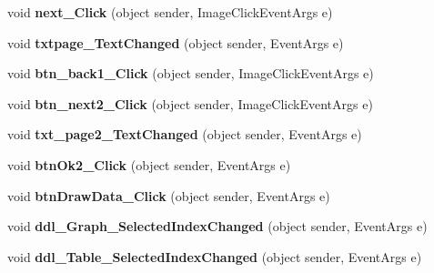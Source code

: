 \begin{DoxyCompactItemize}
\item 
\hypertarget{classusertrackothers__position_a91b5138aec6de0c46f87042d013a19d2}{void {\bfseries next\-\_\-\-Click} (object sender, Image\-Click\-Event\-Args e)}\label{classusertrackothers__position_a91b5138aec6de0c46f87042d013a19d2}

\item 
\hypertarget{classusertrackothers__position_a3e96096427c9e522cbf1294d1a703c29}{void {\bfseries txtpage\-\_\-\-Text\-Changed} (object sender, Event\-Args e)}\label{classusertrackothers__position_a3e96096427c9e522cbf1294d1a703c29}

\item 
\hypertarget{classusertrackothers__position_af262e008d8ef41fec9283cdabdfed466}{void {\bfseries btn\-\_\-back1\-\_\-\-Click} (object sender, Image\-Click\-Event\-Args e)}\label{classusertrackothers__position_af262e008d8ef41fec9283cdabdfed466}

\item 
\hypertarget{classusertrackothers__position_aba6d1bc5745aa77eeb87456227b23a08}{void {\bfseries btn\-\_\-next2\-\_\-\-Click} (object sender, Image\-Click\-Event\-Args e)}\label{classusertrackothers__position_aba6d1bc5745aa77eeb87456227b23a08}

\item 
\hypertarget{classusertrackothers__position_ac4ccb47bc3a40ce40518dc3d2de779a3}{void {\bfseries txt\-\_\-page2\-\_\-\-Text\-Changed} (object sender, Event\-Args e)}\label{classusertrackothers__position_ac4ccb47bc3a40ce40518dc3d2de779a3}

\item 
\hypertarget{classusertrackothers__position_a4a47355f733e2f2f06c2b51a2d56051f}{void {\bfseries btn\-Ok2\-\_\-\-Click} (object sender, Event\-Args e)}\label{classusertrackothers__position_a4a47355f733e2f2f06c2b51a2d56051f}

\item 
\hypertarget{classusertrackothers__position_a1bea12aab729933a631ab41df1131a28}{void {\bfseries btn\-Draw\-Data\-\_\-\-Click} (object sender, Event\-Args e)}\label{classusertrackothers__position_a1bea12aab729933a631ab41df1131a28}

\item 
\hypertarget{classusertrackothers__position_aaa50c9780323266a398b3028f155ef6a}{void {\bfseries ddl\-\_\-\-Graph\-\_\-\-Selected\-Index\-Changed} (object sender, Event\-Args e)}\label{classusertrackothers__position_aaa50c9780323266a398b3028f155ef6a}

\item 
\hypertarget{classusertrackothers__position_a7fbe85d5536a99daa4c6c4c2929fa2ae}{void {\bfseries ddl\-\_\-\-Table\-\_\-\-Selected\-Index\-Changed} (object sender, Event\-Args e)}\label{classusertrackothers__position_a7fbe85d5536a99daa4c6c4c2929fa2ae}


\end{DoxyCompactItemize}
